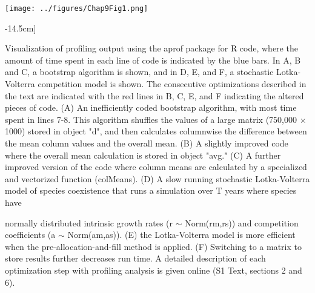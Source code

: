 \documentclass[b5paper,justified]{tufte-book} %
\begin{document}
\begin{fullwidth}
\begin{landscape}
\begin{figure*}
\hspace*{3.5cm}\texttt{[image: ../figures/Chap9Fig1.png]}
\caption[Visualization of profiling output using the aprof package for R code][-14.5cm]{
Visualization of profiling output using the aprof package for R code, where the amount of time spent in each line of code is indicated by the blue bars. In A, B and C, a bootstrap algorithm is shown, and in D, E, and F, a stochastic Lotka-Volterra competition model is shown. The consecutive optimizations described in the text are indicated with the red lines in B, C, E, and F indicating the altered pieces of code. (A) An inefficiently coded bootstrap algorithm, with most time spent in lines 7-8. This algorithm shuffles the values of a large matrix (750,000 $\times$ 1000) stored in object "d", and then calculates columnwise the difference between the mean column values and the overall mean. (B) A slightly improved code where the overall mean calculation is stored in object "avg."  (C) A further improved version of the code where column means are calculated by a specialized and vectorized function (colMeans). (D) A slow running stochastic Lotka-Volterra model of species coexistence that runs a simulation over T years where species have

}\label{fig:chap9fig1}
\footnotesize
\vspace*{0.3cm} \hspace*{3.3cm}\begin{minipage}{21cm}
normally distributed intrinsic growth rates (r $\sim$ Norm(rm,rs)) and competition coefficients (a $\sim$ Norm(am,as)). (E) the Lotka-Volterra model is more efficient when the pre-allocation-and-fill method is applied. (F) Switching to a matrix to store results further decreases run time. A detailed description of each optimization step with profiling analysis is given online (S1 Text, sections 2 and 6).
\end{minipage}
\end{figure*}
\end{landscape}


\end{fullwidth}
\end{document}
